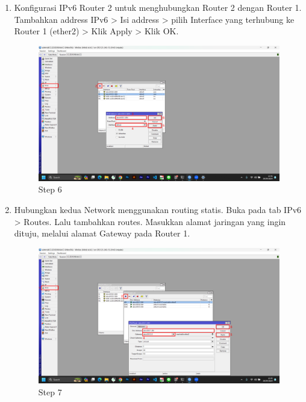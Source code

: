 \begin{center}
\begin{enumerate}
        \item Konfigurasi IPv6 Router 2 untuk menghubungkan Router 2 dengan Router 1. Tambahkan address IPv6 > Isi address > pilih Interface yang terhubung ke Router 1 (ether2) > Klik Apply > Klik OK.
        \begin{figure}[H]
			\centering
			\includegraphics[width=0.8\linewidth]{P5/img/pc2/Step 6.png}
			\caption{Step 6}
			\label{fig:Step 6(PC 2)}
		\end{figure}
        \item Hubungkan kedua Network menggunakan routing statis. Buka pada tab IPv6 > Routes. Lalu tambahkan routes. Masukkan alamat jaringan yang ingin dituju, melalui alamat Gateway pada Router 1.
        \begin{figure}[H]
			\centering
			\includegraphics[width=0.8\linewidth]{P5/img/pc2/Step 7.png}
			\caption{Step 7}
			\label{fig:Step 7(PC 2)}
		\end{figure}
    \end{enumerate}


\end{center}
